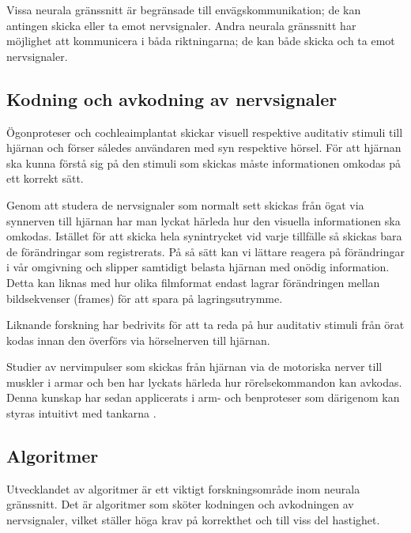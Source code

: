 \documentclass[12pt, a4paper]{article}
\begin{document}
Vissa neurala gränssnitt är begränsade till envägskommunikation; de kan antingen
skicka eller ta emot nervsignaler. Andra neurala gränssnitt har möjlighet att
kommunicera i båda riktningarna; de kan både skicka och ta emot nervsignaler.

\subsection{Kodning och avkodning av nervsignaler}

Ögonproteser \cite{sight2} och cochleaimplantat \cite{sound} skickar visuell
respektive auditativ stimuli till hjärnan och förser således användaren med syn
respektive hörsel. För att hjärnan ska kunna förstå sig på den stimuli som
skickas måste informationen omkodas på ett korrekt sätt.

Genom att studera de nervsignaler som normalt sett skickas från ögat via
synnerven till hjärnan har man lyckat härleda hur den visuella informationen ska
omkodas. Istället för att skicka hela synintrycket vid varje tillfälle så
skickas bara de förändringar som registrerats. På så sätt kan vi lättare reagera
på förändringar i vår omgivning och slipper samtidigt belasta hjärnan med onödig
information. \cite{sight1} Detta kan liknas med hur olika filmformat endast
lagrar förändringen mellan bildsekvenser (frames) för att spara på
lagringsutrymme.


Liknande forskning har bedrivits för att ta reda på hur auditativ stimuli från
örat kodas innan den överförs via hörselnerven till hjärnan.

Studier av nervimpulser som skickas från hjärnan via de motoriska nerver till
muskler i armar och ben har lyckats härleda hur rörelsekommandon kan avkodas.
Denna kunskap har sedan applicerats i arm- och benproteser som därigenom kan
styras intuitivt med tankarna \cite{prosthetic_operation}.

\subsection{Algoritmer}

Utvecklandet av algoritmer är ett viktigt forskningsområde inom neurala
gränssnitt. Det är algoritmer som sköter kodningen och avkodningen av
nervsignaler, vilket ställer höga krav på korrekthet och till viss del
hastighet.
\end{document}
